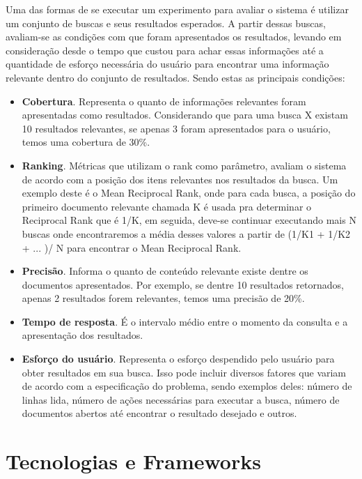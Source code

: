 Uma das formas de se executar um experimento para avaliar o sistema é utilizar um conjunto de buscas e seus resultados esperados. A partir dessas buscas, avaliam-se as condições com que foram apresentados os resultados, levando em consideração desde o tempo que custou para achar essas informações até a quantidade de esforço necessária do usuário para encontrar uma informação relevante dentro do conjunto de resultados. Sendo estas as principais condições:
\begin{itemize}
    \item \textbf{Cobertura}. Representa o quanto de informações relevantes foram apresentadas como resultados. Considerando que para uma busca X existam 10 resultados relevantes, se apenas 3 foram apresentados para o usuário, temos uma cobertura de 30\%.
    \item \textbf{Ranking}. Métricas que utilizam o rank como parâmetro, avaliam o sistema de acordo com a posição dos itens relevantes nos resultados da busca. Um exemplo deste é o Mean Reciprocal Rank, onde para cada busca, a posição do primeiro documento relevante chamada K é usada pra determinar o Reciprocal Rank que é 1/K, em seguida, deve-se continuar executando mais N buscas onde encontraremos a média desses valores a partir de (1/K1 + 1/K2 + ... )/ N para encontrar o Mean Reciprocal Rank.
    \item \textbf{Precisão}. Informa o quanto de conteúdo relevante existe dentre os documentos apresentados. Por exemplo, se dentre 10 resultados retornados, apenas 2 resultados forem relevantes, temos uma precisão de 20\%.
    \item \textbf{Tempo de resposta}. É o intervalo médio entre o momento da consulta e a apresentação dos resultados.
    \item \textbf{Esforço do usuário}. Representa o esforço despendido pelo usuário para obter resultados em sua busca. Isso pode incluir diversos fatores que variam de acordo com a especificação do problema, sendo exemplos deles: número de linhas lida, número de ações necessárias para executar a busca, número de documentos abertos até encontrar o resultado desejado e outros.
\end{itemize}

\section{Tecnologias e Frameworks}

